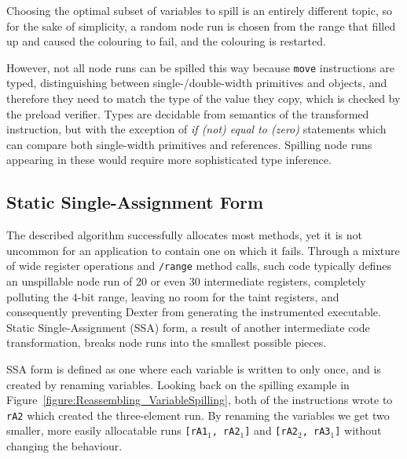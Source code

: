 \documentclass[12pt,twoside,notitlepage]{report}
\begin{document}
Choosing the optimal subset of variables to spill is an entirely different topic, so for the sake of simplicity, a random node run is chosen from the range that filled up and caused the colouring to fail, and the colouring is restarted.

However, not all node runs can be spilled this way because \texttt{move} instructions are typed, distinguishing between single-/double-width primitives and objects, and therefore they need to match the type of the value they copy, which is checked by the preload verifier. Types are decidable from semantics of the transformed instruction, but with the exception of \emph{if (not) equal to (zero)} statements which can compare both single-width primitives and references. Spilling node runs appearing in these would require more sophisticated type inference.

\subsection{Static Single-Assignment Form}

The described algorithm successfully allocates most methods, yet it is not uncommon for an application to contain one on which it fails. Through a mixture of wide register operations and \texttt{/range} method calls, such code typically defines an unspillable node run of 20 or even 30 intermediate registers, completely polluting the 4-bit range, leaving no room for the taint registers, and consequently preventing Dexter from generating the instrumented executable. Static Single-Assignment (SSA) form, a result of another intermediate code transformation, breaks node runs into the smallest possible pieces.

SSA form is defined as one where each variable is written to only once, and is created by renaming variables. Looking back on the spilling example in Figure~\ref{figure:Reassembling_VariableSpilling}, both of the instructions wrote to \texttt{rA2} which created the three-element run. By renaming the variables we get two smaller, more easily allocatable runs \mbox{\texttt{{[}rA1$_1$, rA2$_1$]}} and \mbox{\texttt{{[}rA2$_2$, rA3$_1$]}} without changing the behaviour.
\end{document}
